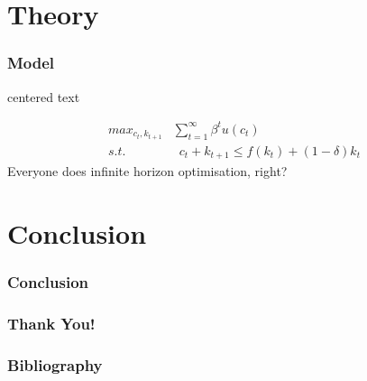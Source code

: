 \documentclass[12pt, aspectratio=169]{beamer}
\begin{document}

\section{Theory}
\begin{frame}[t]\frametitle{Model}
\begin{center}
centered text
\end{center}

\begin{align*}
max_{c_t,k_{t+1}} &  \sum_{t=1}^{\infty} \beta^t u(c_t)  \\
  s.t. & \enspace c_{t} + k_{t+1} \leq f(k_t) + (1-\delta)k_t
\end{align*}
Everyone does infinite horizon optimisation, right?

\end{frame}



\section{Conclusion}

\begin{frame}
\frametitle{Conclusion}
\end{frame}


\begin{frame}
\frametitle{Thank You!}
\end{frame}

\begin{frame}[t]\frametitle{Bibliography}
\printbibliography
\end{frame}

\end{document}
